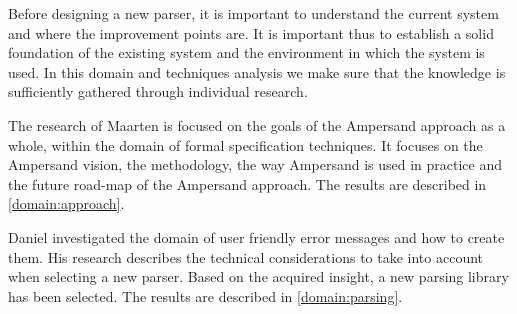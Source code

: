 
Before designing a new parser, it is important to understand the current system and where the improvement points are.
It is important thus to establish a solid foundation of the existing system and the environment in which the system is used.
In this domain and techniques analysis we make sure that the knowledge is sufficiently gathered through individual research.

The research of Maarten is focused on the goals of the Ampersand approach as a whole, within the domain of formal specification techniques.
It focuses on the Ampersand vision, the methodology, the way Ampersand is used in practice and the future road-map of the Ampersand approach.
The results are described in \autoref{domain:approach}.

Daniel investigated the domain of user friendly error messages and how to create them.
His research describes the technical considerations to take into account when selecting a new parser.
Based on the acquired insight, a new parsing library has been selected.
The results are described in \autoref{domain:parsing}.
